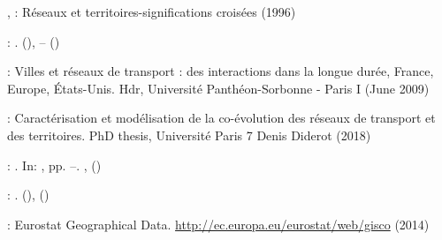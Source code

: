 \documentclass{bmcart}
\begin{document}
\begin{backmatter}
\begin{thebibliography}{59}
\begin{botherref}
,
:
R{\'e}seaux et territoires-significations crois{\'e}es
(1996)
\end{botherref}
\endbibitem

\begin{barticle}
:
.
(),
--
()
\end{barticle}
\endbibitem

\begin{botherref}
:
{Villes et r{\'e}seaux de transport : des interactions dans la longue
  dur{\'e}e, France, Europe, {\'E}tats-Unis}.
Hdr,
Universit{\'e} Panth{\'e}on-Sorbonne - Paris I
(June 2009)
\end{botherref}
\endbibitem

\begin{botherref}
:
Caract{\'e}risation et mod{\'e}lisation de la co-{\'e}volution des r{\'e}seaux
  de transport et des territoires.
PhD thesis,
Universit{\'e} Paris 7 Denis Diderot
(2018)
\end{botherref}
\endbibitem

\begin{bchapter}
:
.
In: ,
pp. --.
,
()
\end{bchapter}
\endbibitem

\begin{barticle}
:
.
(),
()
\end{barticle}
\endbibitem

\begin{botherref}
:
Eurostat Geographical Data.
\url{http://ec.europa.eu/eurostat/web/gisco}
(2014)
\end{botherref}
\endbibitem


\end{thebibliography}
\end{backmatter}
\end{document}
